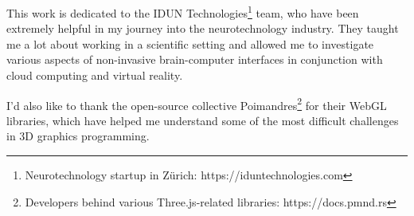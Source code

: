 \begin{dedication}

  This work is dedicated to the IDUN Technologies\footnote{Neurotechnology startup in Zürich: https://iduntechnologies.com} team, who have been extremely helpful in my journey into the neurotechnology industry. They taught me a lot about working in a scientific setting and allowed me to investigate various aspects of non-invasive brain-computer interfaces in conjunction with cloud computing and virtual reality.

  \hfill \break

  I'd also like to thank the open-source collective Poimandres\footnote{Developers behind various Three.js-related libraries: https://docs.pmnd.rs}  for their WebGL libraries, which have helped me understand some of the most difficult challenges in 3D graphics programming.

\end{dedication}
